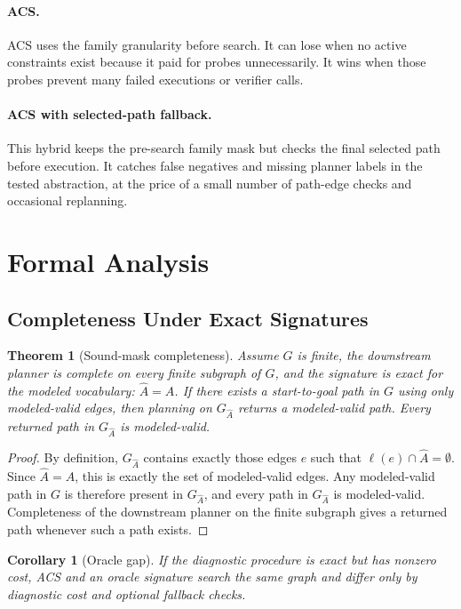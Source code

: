 \documentclass{article}
\newtheorem{theorem}{Theorem}
\newtheorem{corollary}{Corollary}
\newcommand{\ACS}{\textsc{ACS}}
\newcommand{\Ahat}{\hat{A}}
\newcommand{\Gmask}{G_{\Ahat}}
\begin{document}
\paragraph{\ACS{}.}
\ACS{} uses the family granularity before search. It can lose when no active constraints exist because it paid for probes unnecessarily. It wins when those probes prevent many failed executions or verifier calls.

\paragraph{\ACS{} with selected-path fallback.}
This hybrid keeps the pre-search family mask but checks the final selected path before execution. It catches false negatives and missing planner labels in the tested abstraction, at the price of a small number of path-edge checks and occasional replanning.

\section{Formal Analysis}

\subsection{Completeness Under Exact Signatures}

\begin{theorem}[Sound-mask completeness]
Assume $G$ is finite, the downstream planner is complete on every finite subgraph of $G$, and the signature is exact for the modeled vocabulary: $\Ahat=A$. If there exists a start-to-goal path in $G$ using only modeled-valid edges, then planning on $\Gmask$ returns a modeled-valid path. Every returned path in $\Gmask$ is modeled-valid.
\end{theorem}

\begin{proof}
By definition, $\Gmask$ contains exactly those edges $e$ such that $\ell(e)\cap\Ahat=\emptyset$. Since $\Ahat=A$, this is exactly the set of modeled-valid edges. Any modeled-valid path in $G$ is therefore present in $\Gmask$, and every path in $\Gmask$ is modeled-valid. Completeness of the downstream planner on the finite subgraph gives a returned path whenever such a path exists.
\end{proof}

\begin{corollary}[Oracle gap]
If the diagnostic procedure is exact but has nonzero cost, \ACS{} and an oracle signature search the same graph and differ only by diagnostic cost and optional fallback checks.
\end{corollary}
\end{document}
